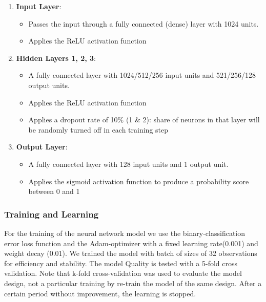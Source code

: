 \documentclass[
]{report}
\providecommand{\tightlist}{%
  \setlength{\itemsep}{0pt}\setlength{\parskip}{0pt}}\usepackage{longtable,booktabs,array}
\begin{document}
\begin{enumerate}
\def\labelenumi{\arabic{enumi}.}
\item
  \textbf{Input Layer}:

  \begin{itemize}
  \tightlist
  \item
    Passes the input through a fully connected (dense) layer with 1024
    units.
  \item
    Applies the ReLU activation function
  \end{itemize}
\item
  \textbf{Hidden Layers 1, 2, 3}:

  \begin{itemize}
  \item
    A fully connected layer with 1024/512/256 input units and
    521/256/128 output units.
  \item
    Applies the ReLU activation function
  \item
    Applies a dropout rate of 10\% (1 \& 2): share of neurons in that
    layer will be randomly turned off in each training step
  \end{itemize}
\item
  \textbf{Output Layer}:

  \begin{itemize}
  \item
    A fully connected layer with 128 input units and 1 output unit.
  \item
    Applies the sigmoid activation function to produce a probability
    score between 0 and 1
  \end{itemize}
\end{enumerate}

\subsubsection{Training and Learning}\label{training-and-learning}

For the training of the neural network model we use the
binary-classification error loss function and the Adam-optimizer with a
fixed learning rate(0.001) and weight decay (0.01). We trained the model
with batch of sizes of 32 observations for efficiency and stability. The
model Quality is tested with a 5-fold cross validation. Note that k-fold
cross-validation was used to evaluate the model design, not a particular
training by re-train the model of the same design. After a certain
period without improvement, the learning is stopped.
\end{document}
